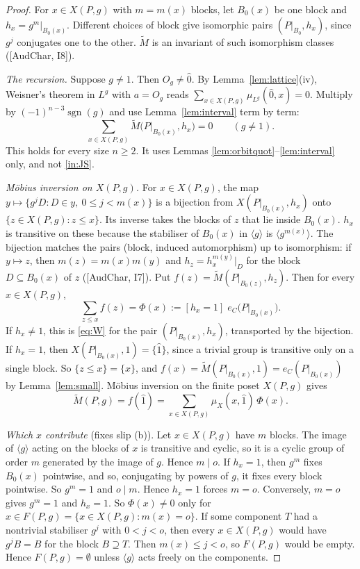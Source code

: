 \documentclass[11pt]{article}
\theoremstyle{definition}
\theoremstyle{remark}
\newcommand{\sgn}{\operatorname{sgn}}
\begin{document}
\begin{proof}
For $x\in X(P,g)$ with $m=m(x)$ blocks, let $B_0(x)$ be one block and
$h_x=g^{m}|_{B_0(x)}$. Different choices of block give isomorphic pairs
$(P|_{B_0},h_x)$, since $g^j$ conjugates one to the other. $\widetilde M$ is
an invariant of such isomorphism classes ([AudChar, I8]).

\emph{The recursion.} Suppose $g\ne1$. Then $O_g\ne\hat0$. By
Lemma~\ref{lem:lattice}(iv), Weisner's theorem in $L^g$ with $a=O_g$ reads
$\sum_{x\in X(P,g)}\mu_{L^g}(\hat0,x)=0$. Multiply by $(-1)^{n-3}\sgn(g)$ and
use Lemma~\ref{lem:interval} term by term:
\begin{equation}\label{eq:W}
\sum_{x\in X(P,g)}\widetilde M\bigl(P|_{B_0(x)},h_x\bigr)=0\qquad(g\ne1).\tag{W}
\end{equation}
This holds for every size $n\ge2$. It uses Lemmas
\ref{lem:orbitquot}--\ref{lem:interval} only, and not \ref{in:JS}.

\emph{M\"obius inversion on $X(P,g)$.} For $x\in X(P,g)$, the map
$y\mapsto\{g^jD:D\in y,\ 0\le j<m(x)\}$ is a bijection from
$X(P|_{B_0(x)},h_x)$ onto $\{z\in X(P,g):z\le x\}$. Its inverse takes the
blocks of $z$ that lie inside $B_0(x)$. $h_x$ is transitive on these because
the stabiliser of $B_0(x)$ in $\langle g\rangle$ is $\langle g^{m(x)}\rangle$.
The bijection matches the pairs (block, induced automorphism) up to
isomorphism: if $y\mapsto z$, then $m(z)=m(x)m(y)$ and
$h_z=h_x^{m(y)}|_{D}$ for the block $D\subseteq B_0(x)$ of $z$
([AudChar, I7]). Put $f(z)=\widetilde M(P|_{B_0(z)},h_z)$. Then for every
$x\in X(P,g)$,
\[
\sum_{z\le x}f(z)=\Phi(x):=[h_x=1]\;e_C\bigl(P|_{B_0(x)}\bigr).
\]
If $h_x\ne1$, this is \eqref{eq:W} for the pair $(P|_{B_0(x)},h_x)$,
transported by the bijection. If $h_x=1$, then $X(P|_{B_0(x)},1)=\{\hat1\}$,
since a trivial group is transitive only on a single block. So
$\{z\le x\}=\{x\}$, and $f(x)=\widetilde M(P|_{B_0(x)},1)=e_C(P|_{B_0(x)})$
by Lemma~\ref{lem:small}. M\"obius inversion on the finite poset $X(P,g)$
gives
\[
\widetilde M(P,g)=f(\hat1)=\sum_{x\in X(P,g)}\mu_X(x,\hat1)\,\Phi(x).
\]

\emph{Which $x$ contribute} (fixes slip (b)). Let $x\in X(P,g)$ have $m$
blocks. The image of $\langle g\rangle$ acting on the blocks of $x$ is
transitive and cyclic, so it is a cyclic group of order $m$ generated by the
image of $g$. Hence $m\mid o$. If $h_x=1$, then $g^m$ fixes $B_0(x)$
pointwise, and so, conjugating by powers of $g$, it fixes every block
pointwise. So $g^m=1$ and $o\mid m$. Hence $h_x=1$ forces $m=o$. Conversely,
$m=o$ gives $g^m=1$ and $h_x=1$. So $\Phi(x)\ne0$ only for
$x\in F(P,g)=\{x\in X(P,g):m(x)=o\}$. If some component $T$ had a nontrivial
stabiliser $g^j$ with $0<j<o$, then every $x\in X(P,g)$ would have
$g^jB=B$ for the block $B\supseteq T$. Then $m(x)\le j<o$, so $F(P,g)$ would
be empty. Hence $F(P,g)=\emptyset$ unless $\langle g\rangle$ acts freely on
the components.


\end{proof}
\end{document}
